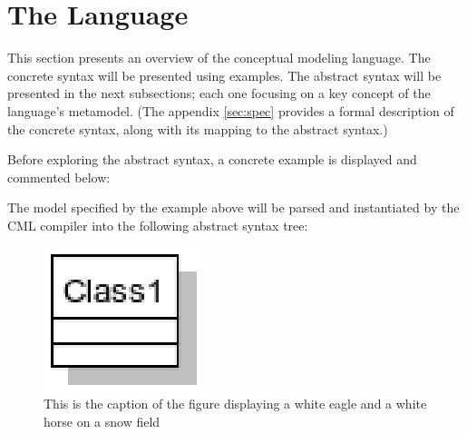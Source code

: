 \section{The Language}\label{sec:lang}
%
This section presents an overview of the conceptual modeling language.
The concrete syntax will be presented using examples.
The abstract syntax will be presented in the next subsections; each one focusing on a key concept of the language's metamodel. (The appendix \ref{sec:spec} provides a formal description of the concrete syntax, along with its mapping to the abstract syntax.)

Before exploring the abstract syntax, a concrete example is displayed and commented below:



The model specified by the example above will be parsed and instantiated by the CML compiler into the following abstract syntax tree:

\begin{figure}
\centering
\includegraphics{language/main}
\caption{This is the caption of the figure displaying a white eagle and
a white horse on a snow field}
\end{figure}
